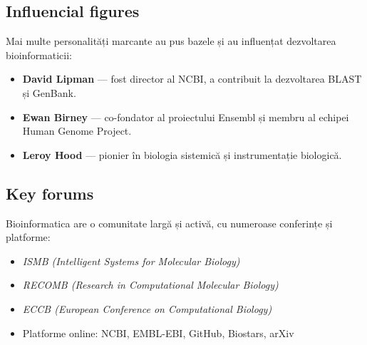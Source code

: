 \documentclass[12pt, letterpaper]{article}
\begin{document}
\subsection*{Influencial figures}
Mai multe personalități marcante au pus bazele și au influențat dezvoltarea bioinformaticii:
\begin{itemize}
    \item \textbf{David Lipman} — fost director al NCBI, a contribuit la dezvoltarea BLAST și GenBank.
    \item \textbf{Ewan Birney} — co-fondator al proiectului Ensembl și membru al echipei Human Genome Project.
    \item \textbf{Leroy Hood} — pionier în biologia sistemică și instrumentație biologică.
\end{itemize}

\subsection*{Key forums}
Bioinformatica are o comunitate largă și activă, cu numeroase conferințe și platforme:
\begin{itemize}
    \item \textit{ISMB (Intelligent Systems for Molecular Biology)}
    \item \textit{RECOMB (Research in Computational Molecular Biology)}
    \item \textit{ECCB (European Conference on Computational Biology)}
    \item Platforme online: NCBI, EMBL-EBI, GitHub, Biostars, arXiv
\end{itemize}


\newpage
\end{document}
